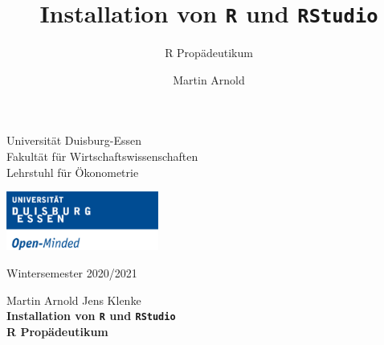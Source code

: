 \documentclass[12pt,a4paper]{article}
\title{Installation von \texttt{R} und \texttt{RStudio}}
\subtitle{R Propädeutikum}
\author{Martin Arnold}
\date{}
\begin{document}

\restoregeometry



\begin{minipage}{0.6\textwidth}
Universität Duisburg-Essen\\
Fakultät für Wirtschaftswissenschaften\\
Lehrstuhl für Ökonometrie\\
\end{minipage}

	\begin{flushright}
	\vspace{-3cm}
	\includegraphics*[width=5cm]{Includes/duelogo_en.png}\\
	\vspace{.125cm}
	\end{flushright}
\hspace{-0.005cm}Wintersemester 2020/2021

\vspace{0.05cm}

\begin{center}
	\vspace{.25cm}
	Martin Arnold \hspace{.5cm} Jens Klenke \\
	\vspace{.25cm}
	\textbf{\Large{Installation von \texttt{R} und \texttt{RStudio}}}\\
	\vspace{.25cm}
	\textbf{\large{R Propädeutikum}}\\
	\vspace{.125cm}
\end{center}




\end{document}
